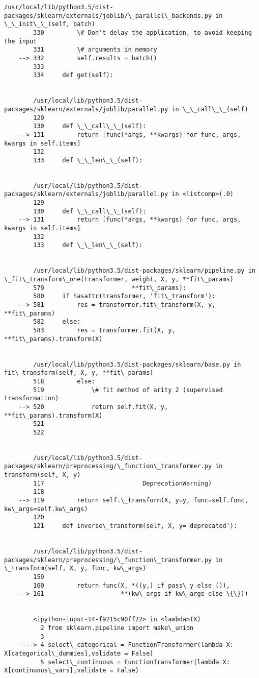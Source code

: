 \documentclass[11pt]{article}
\begin{document}
\begin{Verbatim}[commandchars=\\\{\}]
        /usr/local/lib/python3.5/dist-packages/sklearn/externals/joblib/\_parallel\_backends.py in \_\_init\_\_(self, batch)
        330         \# Don't delay the application, to avoid keeping the input
        331         \# arguments in memory
    --> 332         self.results = batch()
        333 
        334     def get(self):


        /usr/local/lib/python3.5/dist-packages/sklearn/externals/joblib/parallel.py in \_\_call\_\_(self)
        129 
        130     def \_\_call\_\_(self):
    --> 131         return [func(*args, **kwargs) for func, args, kwargs in self.items]
        132 
        133     def \_\_len\_\_(self):


        /usr/local/lib/python3.5/dist-packages/sklearn/externals/joblib/parallel.py in <listcomp>(.0)
        129 
        130     def \_\_call\_\_(self):
    --> 131         return [func(*args, **kwargs) for func, args, kwargs in self.items]
        132 
        133     def \_\_len\_\_(self):


        /usr/local/lib/python3.5/dist-packages/sklearn/pipeline.py in \_fit\_transform\_one(transformer, weight, X, y, **fit\_params)
        579                        **fit\_params):
        580     if hasattr(transformer, 'fit\_transform'):
    --> 581         res = transformer.fit\_transform(X, y, **fit\_params)
        582     else:
        583         res = transformer.fit(X, y, **fit\_params).transform(X)


        /usr/local/lib/python3.5/dist-packages/sklearn/base.py in fit\_transform(self, X, y, **fit\_params)
        518         else:
        519             \# fit method of arity 2 (supervised transformation)
    --> 520             return self.fit(X, y, **fit\_params).transform(X)
        521 
        522 


        /usr/local/lib/python3.5/dist-packages/sklearn/preprocessing/\_function\_transformer.py in transform(self, X, y)
        117                           DeprecationWarning)
        118 
    --> 119         return self.\_transform(X, y=y, func=self.func, kw\_args=self.kw\_args)
        120 
        121     def inverse\_transform(self, X, y='deprecated'):


        /usr/local/lib/python3.5/dist-packages/sklearn/preprocessing/\_function\_transformer.py in \_transform(self, X, y, func, kw\_args)
        159 
        160         return func(X, *((y,) if pass\_y else ()),
    --> 161                     **(kw\_args if kw\_args else \{\}))
    

        <ipython-input-14-f9215c90ff22> in <lambda>(X)
          2 from sklearn.pipeline import make\_union
          3 
    ----> 4 select\_categorical = FunctionTransformer(lambda X: X[categorical\_dummies],validate = False)
          5 select\_continuous = FunctionTransformer(lambda X: X[continuous\_vars],validate = False)



\end{Verbatim}
\end{document}
